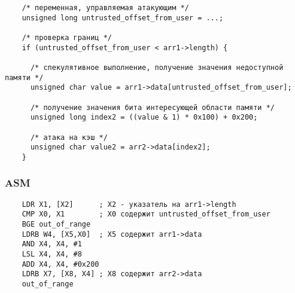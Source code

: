\begin{frame}[fragile]{\insertsubsubsection}

  \begin{verbatim}
    /* переменная, управляемая атакующим */
    unsigned long untrusted_offset_from_user = ...;

    /* проверка границ */
    if (untrusted_offset_from_user < arr1->length) {

      /* спекулятивное выполнение, получение значения недоступной памяти */
      unsigned char value = arr1->data[untrusted_offset_from_user];

      /* получение значения бита интересующей области памяти */
      unsigned long index2 = ((value & 1) * 0x100) + 0x200;

      /* атака на кэш */
      unsigned char value2 = arr2->data[index2];
    }
  \end{verbatim}

\end{frame}

\subsubsection{ASM}
\begin{frame}[fragile]{\insertsubsubsection}

  \begin{verbatim}
    LDR X1, [X2]      ; X2 - указатель на arr1->length
    CMP X0, X1        ; X0 содержит untrusted_offset_from_user
    BGE out_of_range
    LDRB W4, [X5,X0]  ; X5 содержит arr1->data
    AND X4, X4, #1
    LSL X4, X4, #8
    ADD X4, X4, #0x200
    LDRB X7, [X8, X4] ; X8 содержит arr2->data
    out_of_range
  \end{verbatim}


\end{frame}


